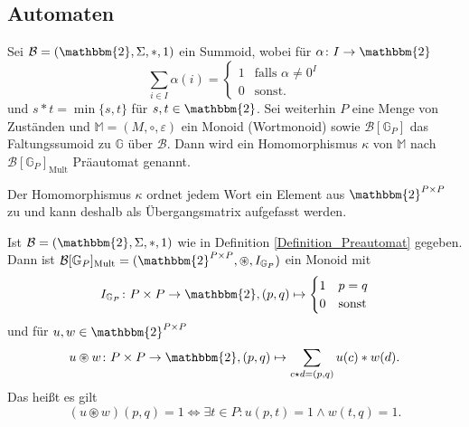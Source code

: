 \documentclass{article}
\begin{document}
\subsection{Automaten}

\begin{definition}\label{Definition_Preautomat}
  Sei $\mathcal{B} = (\mathbbm{2}, \Sigma, \ast, 1)$ ein Summoid,
  wobei für $\alpha \colon I \to \mathbbm{2}$
  \begin{equation*}
    \sum_{i \in I}\alpha(i) = 
    \begin{cases}
      1 & \text{falls } \alpha \neq 0^I \\
      0 & \text{sonst.}
    \end{cases}
  \end{equation*}
  und $s \ast t = \min \{s, t\}$ für $s, t \in \mathbbm{2}$.
  Sei weiterhin $P$ eine Menge von Zuständen 
  und $\mathbb{M} = (M, \circ, \varepsilon)$ ein Monoid (Wortmonoid)
  sowie $\mathcal{B}[\mathbb{G}_P]$ das Faltungssumoid zu $\mathbb{G}$ über $\mathcal{B}$.
  Dann wird ein Homomorphismus $\kappa$ von $\mathbb{M}$ nach $\mathcal{B}[\mathbb{G}_P]_\text{Mult}$ Präautomat genannt.

  Der Homomorphismus $\kappa$ ordnet jedem Wort ein Element aus $\mathbbm{2}^{P \times P}$ zu
  und kann deshalb als Übergangsmatrix aufgefasst werden.
\end{definition}

\begin{remark}
  Ist $\mathcal{B} = (\mathbbm{2}, \Sigma, \ast, 1)$ wie in Definition \ref{Definition_Preautomat} gegeben.
  Dann ist $\mathcal{B}[\mathbb{G}_P]_\text{Mult} = (\mathbbm{2}^{P \times P}, \circledast, I_{\mathbb{G}_P})$
  ein Monoid mit
  \begin{equation*}
    I_{\mathbb{G}_P} \colon P \times P \to \mathbbm{2}, (p, q) \mapsto
    \begin{cases}
      1 & p = q \\
      0 & \text{sonst}
    \end{cases}
  \end{equation*}
  und für $u, w \in \mathbbm{2}^{P \times P}$
  \begin{equation*}
    u \circledast w \colon P \times P \to \mathbbm{2}, (p, q) \mapsto
    \sum_{c \star d = (p, q)} u(c) \ast w(d).
  \end{equation*}
  Das heißt es gilt
  \begin{equation*}
    (u \circledast w)(p, q) = 1 \iff \exists t \in P \colon u(p, t) = 1 \wedge w(t, q) = 1.
  \end{equation*}
\end{remark}
\end{document}
